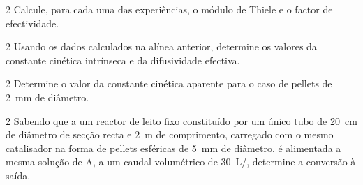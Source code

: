 \documentclass[\mainfilename]{subfiles}
\begin{document}
\begin{questionBox}2{ %
    Calcule, para cada uma das experiências, o módulo de Thiele e o factor de efectividade.
} %
\end{questionBox}

\begin{questionBox}2{ %
    Usando os dados calculados na alínea anterior, determine os valores da constante cinética intrínseca e da difusividade efectiva.
} %
\end{questionBox}

\begin{questionBox}2{ %
    Determine o valor da constante cinética aparente para o caso de pellets de \qty*{2}{\mm} de diâmetro.
} %
\end{questionBox}

\begin{questionBox}2{ %
    Sabendo que a um reactor de leito fixo constituído por um único tubo de \qty*{20}{\cm} de diâmetro de secção recta e \qty*{2}{\m} de comprimento, carregado com o mesmo catalisador na forma de pellets esféricas de \qty*{5}{\mm} de diâmetro, é alimentada a mesma solução de A, a um caudal volumétrico de \qty*{30}{\L/\min}, determine a conversão à saída.
} %
\end{questionBox}
\end{document}
